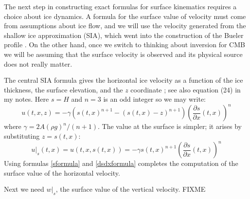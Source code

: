 \documentclass[letterpaper,final,12pt,reqno]{amsart}
\begin{document}
The next step in constructing exact formulas for surface kinematics requires a choice about ice dynamics.  A formula for the surface value of velocity must come from assumptions about ice flow, and we will use the velocity generated from the shallow ice approximation (SIA), which went into the construction of the Bueler profile \cite[section 5.3]{vanderVeen2013}.  On the other hand, once we switch to thinking about inversion for CMB we will be assuming that the surface velocity is observed and its physical source does not really matter.

The central SIA formula gives the horizontal ice velocity as a function of the ice thickness, the surface elevation, and the $z$ coordinate \cite{GreveBlatter2009,vanderVeen2013}; see also equation (24) in my notes.  Here $s=H$ and $n=3$ is an odd integer so we may write:
\begin{equation}
u(t,x,z) = - \gamma \left(s(t,x)^{n+1} - (s(t,x)-z)^{n+1}\right) \left(\frac{\partial s}{\partial x}(t,x)\right)^n \label{siaxz}
\end{equation}
where $\gamma = 2 A (\rho g)^n / (n+1)$.  The value at the surface is simpler; it arises by substituting $z=s(t,x)$:
\begin{equation}
u|_s(t,x) = u(t,x,s(t,x)) = - \gamma s(t,x)^{n+1} \left(\frac{\partial s}{\partial x}(t,x)\right)^n \label{siasurfacex}
\end{equation}
Using formulas \eqref{sformula} and \eqref{dsdxformula} completes the computation of the surface value of the horizontal velocity.

Next we need $w|_s$, the surface value of the vertical velocity.  FIXME

\small
\bigskip


\end{document}
